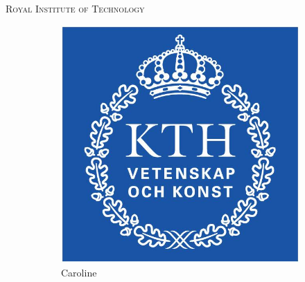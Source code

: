 \documentclass[a4paper,10pt]{article}
\title{}
\author{}
\begin{document}
\begin{titlepage}
\begin{center}


\textsc{\LARGE Royal Institute of Technology}\\[1.5cm]


\begin{figure}[h]
        \centering
        \begin{subfigure}[b]{0.2\textwidth}
                \centering
                \includegraphics[width=\textwidth]{kth_mathematics_rgb.jpg}
                \caption{Caroline}
                \label{fig:Caroline}
        \end{subfigure}%
        ~ %
        \begin{subfigure}[b]{0.2\textwidth}
                \centering

\end{subfigure}
\end{figure}
\end{center}
\end{titlepage}
\end{document}
